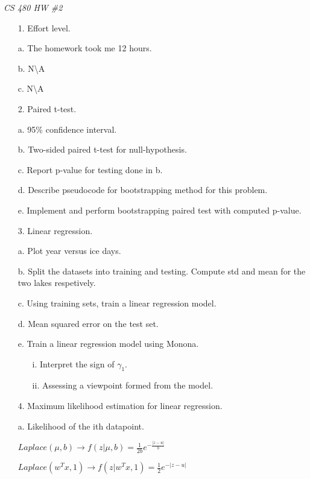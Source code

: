 \documentclass[12pt]{report}
\begin{document}
\centerline{\it CS 480 HW \#2}

\begin{enumerate}

\item[1.] Effort level.

\item[a.] The homework took me 12 hours.
\item[b.] N\textbackslash A
\item[c.] N\textbackslash A

\item[2.] Paired t-test.

\item[a.] 95\% confidence interval.
\item[b.] Two-sided paired t-test for null-hypothesis.
\item[c.] Report p-value for testing done in b.
\item[d.] Describe pseudocode for bootstrapping method for this problem.
\item[e.] Implement and perform bootstrapping paired test with computed p-value.

\item[3.] Linear regression.

\item[a.] Plot year versus ice days.
\item[b.] Split the datasets into training and testing. Compute std and mean for
  the two lakes respetively.
\item[c.] Using training sets, train a linear regression model.
\item[d.] Mean squared error on the test set.
\item[e.] Train a linear regression model using Monona.
  \begin{itemize}
  \item[i.] Interpret the sign of $\gamma_1$.
  \item[ii.] Assessing a viewpoint formed from the model.
  \end{itemize}

\item[4.] Maximum likelihood estimation for linear regression.

\item[a.] Likelihood of the ith datapoint.

  $Laplace(\mu ,b) \rightarrow f(z|\mu , b) = \frac{1}{2b}e^{-\frac{|z-u|}{b}}$

  $Laplace(w^Tx,1) \rightarrow f(z|w^Tx, 1) = \frac{1}{2}e^{-|z-u|}$


\end{enumerate}
\end{document}
